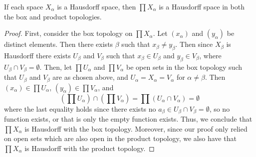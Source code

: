 \documentclass[12pt, a4paper, oneside, openright, titlepage]{book}
\begin{document}
\begin{theorem}
    If each space $X_{\alpha}$ is a Hausdorff space, then $\prod X_{\alpha}$ is a Hausdorff space in both the box and product topologies.
\end{theorem}
\begin{proof}
    First, consider the box topology on $\prod X_{\alpha}$. Let $(x_{\alpha})$ and $(y_{\alpha})$ be distinct elements. Then there exists $\beta$ such that $x_{\beta} \neq y_{\beta}$. Then since $X_{\beta}$ is Hausdorff there exists $U_{\beta}$ and $V_{\beta}$ such that $x_{\beta} \in U_{\beta}$ and $y_{\beta} \in V_{\beta}$, where $U_{\beta}\cap V_{\beta} = \emptyset$. Then, let $\prod U_{\alpha}$ and $\prod V_{\alpha}$ be open sets in the box topology such that $U_{\beta}$ and $V_{\beta}$ are as chosen above, and $U_{\alpha} = X_{\alpha} = V_{\alpha}$ for $\alpha \neq \beta$. Then $(x_{\alpha}) \in \prod U_{\alpha}$, $(y_{\alpha}) \in \prod V_{\alpha}$, and \begin{equation*}
        \left(\prod U_{\alpha}\right)\cap \left(\prod V_{\alpha}\right) = \prod (U_{\alpha}\cap V_{\alpha}) = \emptyset
    \end{equation*}
    where the last equality holds since there exists no $a_{\beta} \in U_{\beta}\cap V_{\beta} = \emptyset$, so no function exists, or that is only the empty function exists. Thus, we conclude that $\prod X_{\alpha}$ is Hausdorff with the box topology. Moreover, since our proof only relied on open sets which are also open in the product topology, we also have that $\prod X_{\alpha}$ is Hausdorff with the product topology.
\end{proof}
\end{document}
